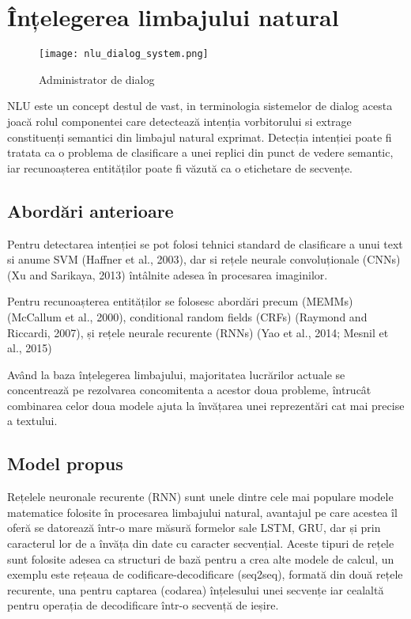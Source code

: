 \section{Înțelegerea limbajului natural}
\begin{figure}[h]
	\centering
	\texttt{[image: nlu\_dialog\_system.png]}
	\caption{Administrator de dialog}
	\label{fig:ds_proc}
\end{figure}
NLU este un concept destul de vast, in terminologia sistemelor de dialog acesta joacă rolul componentei care detectează intenția vorbitorului si extrage constituenți semantici din limbajul natural exprimat.
Detecția intenției poate fi tratata ca o problema de clasificare a unei replici din punct de vedere semantic, iar recunoașterea entităților poate fi văzută ca o etichetare de secvențe.
\subsection{Abordări anterioare}


Pentru detectarea intenției se pot folosi tehnici standard de clasificare a unui text si anume SVM (Haffner et al., 2003), dar si rețele neurale convoluționale (CNNs) (Xu and Sarikaya, 2013) întâlnite adesea în procesarea imaginilor.

Pentru recunoașterea entităților se folosesc abordări precum (MEMMs) (McCallum et al., 2000), conditional random fields (CRFs) (Raymond and Riccardi, 2007), și rețele neurale recurente (RNNs) (Yao et al., 2014; Mesnil et al., 2015)

Având la baza înțelegerea limbajului, majoritatea lucrărilor actuale se concentrează pe rezolvarea concomitenta a acestor doua probleme, întrucât combinarea celor doua modele ajuta la învățarea unei reprezentări cat mai precise a textului. \cite{joint models-attention models}


\subsection{Model propus}

Rețelele neuronale recurente (RNN) sunt unele dintre cele mai populare modele matematice folosite în procesarea limbajului natural, avantajul pe care acestea îl oferă se datorează într-o mare măsură formelor sale LSTM, GRU, dar și prin caracterul lor de a învăța din date cu caracter secvențial. Aceste tipuri de rețele sunt folosite adesea ca structuri de bază pentru a crea alte modele de calcul, un exemplu este rețeaua de codificare-decodificare (seq2seq), formată din două rețele recurente, una pentru captarea (codarea) înțelesului unei secvențe iar cealaltă pentru operația de decodificare într-o secvență de ieșire.

